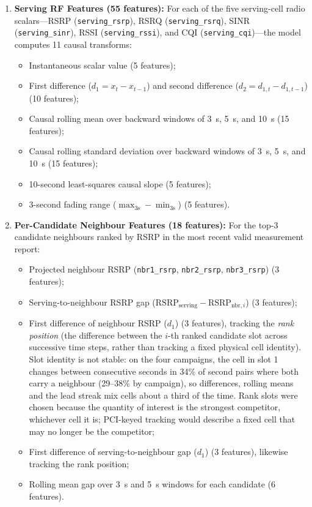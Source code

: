 \begin{enumerate}
    \item \textbf{Serving RF Features (55 features):} For each of the five serving-cell radio scalars---RSRP (\texttt{serving\_}\allowbreak\texttt{rsrp}), RSRQ (\texttt{serving\_}\allowbreak\texttt{rsrq}), SINR (\texttt{serving\_}\allowbreak\texttt{sinr}), RSSI (\texttt{serving\_}\allowbreak\texttt{rssi}), and CQI (\texttt{serving\_}\allowbreak\texttt{cqi})---the model computes 11 causal transforms:
    \begin{itemize}
        \item Instantaneous scalar value (5 features);
        \item First difference ($d_1 = x_t - x_{t-1}$) and second difference ($d_2 = d_{1,t} - d_{1,t-1}$) (10 features);
        \item Causal rolling mean over backward windows of 3~s, 5~s, and 10~s (15 features);
        \item Causal rolling standard deviation over backward windows of 3~s, 5~s, and 10~s (15 features);
        \item 10-second least-squares causal slope (5 features);
        \item 3-second fading range ($\max_{3\text{s}} - \min_{3\text{s}}$) (5 features).
    \end{itemize}

    \item \textbf{Per-Candidate Neighbour Features (18 features):} For the top-3 candidate neighbours ranked by RSRP in the most recent valid measurement report:
    \begin{itemize}
        \item Projected neighbour RSRP (\texttt{nbr1\_rsrp}, \texttt{nbr2\_rsrp}, \texttt{nbr3\_rsrp}) (3 features);
        \item Serving-to-neighbour RSRP gap ($\text{RSRP}_{\text{serving}} - \text{RSRP}_{\text{nbr},i}$) (3 features);
        \item First difference of neighbour RSRP ($d_1$) (3 features), tracking the \emph{rank position} (the difference between the $i$-th ranked candidate slot across successive time steps, rather than tracking a fixed physical cell identity). Slot identity is not stable: on the four campaigns, the cell in slot 1 changes between consecutive seconds in 34\% of second pairs where both carry a neighbour (29--38\% by campaign), so differences, rolling means and the lead streak mix cells about a third of the time. Rank slots were chosen because the quantity of interest is the strongest competitor, whichever cell it is; PCI-keyed tracking would describe a fixed cell that may no longer be the competitor;
        \item First difference of serving-to-neighbour gap ($d_1$) (3 features), likewise tracking the rank position;
        \item Rolling mean gap over 3~s and 5~s windows for each candidate (6 features).
    \end{itemize}


\end{enumerate}

